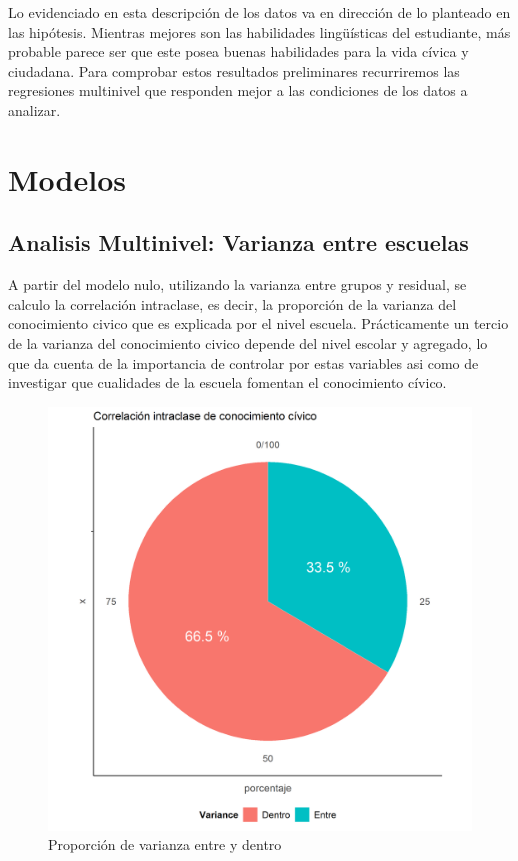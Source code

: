 \documentclass[12pt,twoside]{templates/facsothesis}
\begin{document}
Lo evidenciado en esta descripción de los datos va en dirección de lo planteado en las hipótesis. Mientras mejores son las habilidades lingüísticas del estudiante, más probable parece ser que este posea buenas habilidades para la vida cívica y ciudadana. Para comprobar estos resultados preliminares recurriremos las regresiones multinivel que responden mejor a las condiciones de los datos a analizar.

\hypertarget{modelos}{%
\section{Modelos}\label{modelos}}

\hypertarget{analisis-multinivel-varianza-entre-escuelas}{%
\subsection{Analisis Multinivel: Varianza entre escuelas}\label{analisis-multinivel-varianza-entre-escuelas}}

A partir del modelo nulo, utilizando la varianza entre grupos y residual, se calculo la correlación intraclase, es decir, la proporción de la varianza del conocimiento civico que es explicada por el nivel escuela. Prácticamente un tercio de la varianza del conocimiento civico depende del nivel escolar y agregado, lo que da cuenta de la importancia de controlar por estas variables asi como de investigar que cualidades de la escuela fomentan el conocimiento cívico.

\begin{figure}[!ht]

{\centering \includegraphics[width=0.5\linewidth,]{images/iccplot} 

}

\caption{Proporción de varianza entre y dentro}\label{fig:unnamed-chunk-12}
\end{figure}
\end{document}

